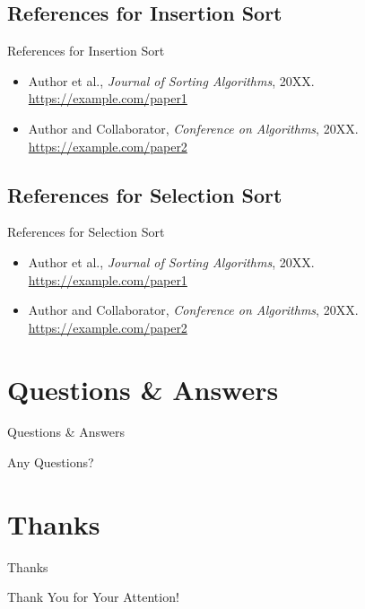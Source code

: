 \documentclass{beamer}
\begin{document}
\subsection{References for Insertion Sort}
\begin{frame}{References for Insertion Sort}
  \begin{itemize}
    \item Author et al., \emph{Journal of Sorting Algorithms}, 20XX.\\
    \href{https://example.com/paper1}{https://example.com/paper1}
    \item Author and Collaborator, \emph{Conference on Algorithms}, 20XX.\\
    \href{https://example.com/paper2}{https://example.com/paper2}
  \end{itemize}
\end{frame}

\subsection{References for Selection Sort}
\begin{frame}{References for Selection Sort}
  \begin{itemize}
    \item Author et al., \emph{Journal of Sorting Algorithms}, 20XX.\\
    \href{https://example.com/paper1}{https://example.com/paper1}
    \item Author and Collaborator, \emph{Conference on Algorithms}, 20XX.\\
    \href{https://example.com/paper2}{https://example.com/paper2}
  \end{itemize}
\end{frame}


\section{Questions \& Answers}
\begin{frame}{Questions \& Answers}
  \begin{center}
    \Huge Any Questions?
  \end{center}
\end{frame}

\section{Thanks}
\begin{frame}{Thanks}
  \begin{center}
    \Huge Thank You for Your Attention!
  \end{center}
\end{frame}
\end{document}
